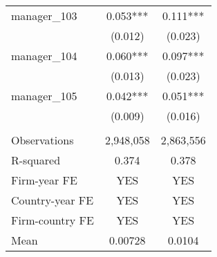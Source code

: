 \begin{tabular}{lcc}
manager\_103 & 0.053*** & 0.111*** \\
 & (0.012) & (0.023) \\
manager\_104 & 0.060*** & 0.097*** \\
 & (0.013) & (0.023) \\
manager\_105 & 0.042*** & 0.051*** \\
 & (0.009) & (0.016) \\
 &  &  \\
Observations & 2,948,058 & 2,863,556 \\
R-squared & 0.374 & 0.378 \\
Firm-year FE & YES & YES \\
Country-year FE & YES & YES \\
Firm-country FE & YES & YES \\
 Mean & 0.00728 & 0.0104 \\ \hline
\end{tabular}
